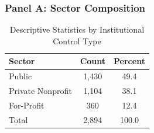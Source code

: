 \begin{table}[htbp]
\centering
\caption{Descriptive Statistics by Institutional Control Type}
\label{tab:descriptives}

\subsubsection*{Panel A: Sector Composition}
\begin{tabular}{lcc}
\toprule
\textbf{Sector} & \textbf{Count} & \textbf{Percent} \\
\midrule
Public & 1,430 & 49.4 \\
Private Nonprofit & 1,104 & 38.1 \\
For-Profit & 360 & 12.4 \\
\midrule
Total & 2,894 & 100.0 \\
\bottomrule
\end{tabular}

\vspace{12pt}

\end{table}
